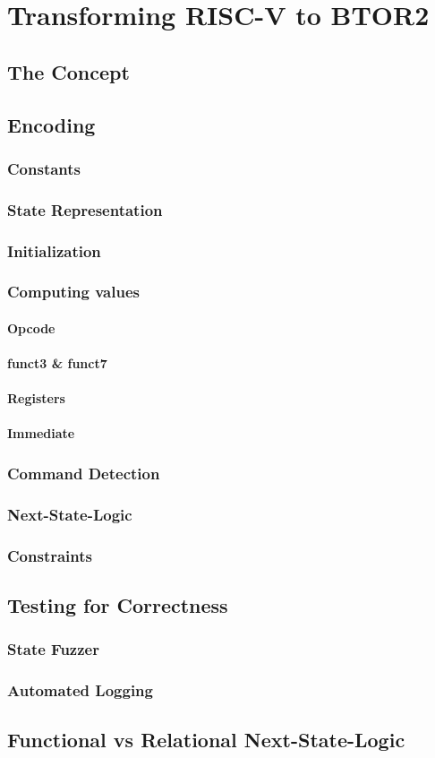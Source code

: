 \chapter{Transforming RISC-V to BTOR2}\label{chap:riscv_to_btor2}
\section{The Concept}
\section{Encoding}
\subsection{Constants}
\subsection{State Representation}
\subsection{Initialization}
\subsection{Computing values}
\subsubsection{Opcode}
\subsubsection{funct3 \& funct7}
\subsubsection{Registers}
\subsubsection{Immediate}
\subsection{Command Detection}
\subsection{Next-State-Logic}
\subsection{Constraints}
\section{Testing for Correctness}
\subsection{State Fuzzer}
\subsection{Automated Logging}
\section{Functional vs Relational Next-State-Logic}